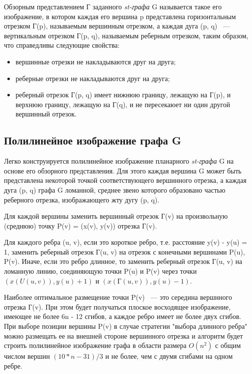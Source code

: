 Обзорным представлением Г заданного \textit{st-графа} G называется такое его изображение, в котором каждая его вершина p представлена горизонтальным отрезком Г(p), называемым вершинным отрезком, а каждая дуга (p, q) ~--- вертикальным отрезком Г(p, q), называемым реберным отрезком, таким образом, что справедливы следующие свойства:
\begin{itemize}
\item вершинные отрезки не накладываются друг на друга;
\item реберные отрезки не накладываются друг на друга;
\item реберный отрезок Г(p, q) имеет нижнюю границу, лежащую на Г(p), и верхнюю границу, лежащую на Г(q), и не пересекаюет ни один другой вершинный отрезок.
\end{itemize}

\subsection{Полилинейное изображение графа G}

Легко конструируется полилинейное изображение планарного \textit{st-графа} G на основе его обзорного представления. Для этого каждая вершина G может быть представлена некоторой точкой соответствующего вершинного отрезка, а каждая дуга (p, q) графа G ломанной, среднее звено которого образовано частью реберного отрезка, изображающего жту дугу (p, q).

Для каждой вершины заменить вершинный отрезок Г(v) на произвольную (среднюю) точку P(v) = (x(v), y(v)) отрезка Г(v).

Для каждого ребра (u, v), если это короткое ребро, т.е. расстояние y(v) - y(u) = 1, заменить реберный отрезок Г(u, v) на отрезок с конечными вершинами P(u), P(v). Иначе, если это ребро длинное, то заменить реберный отрезок Г(u, v) на ломанную линию, соединяющую точки P(u) и P(v) через точки $ (x(U(u, v)), y(u) + 1) $ и $ (x(Г(u, v)), y(u) - 1) $.

Наиболее оптимальное размещение точки P(v) ~--- это середина вершнного отрезка Г(v). При этом будет получаться плоское восходящее изображение, имеющее не более 6n - 12 сгибов, а каждое ребро имеет не более двух сгибов. При выборе позиции вершины P(v) в случае стратегии "выбора длинного ребра" можно размещать ее на внешней стороне вершинного отрезка и алгоритм будет строить полилинейное изображение графа в области размера $ O(n^{2}) $ с общим числом вершин $ (10 * n - 31) / 3 $ и не более, чем с двумя сгибами на одном ребре.

